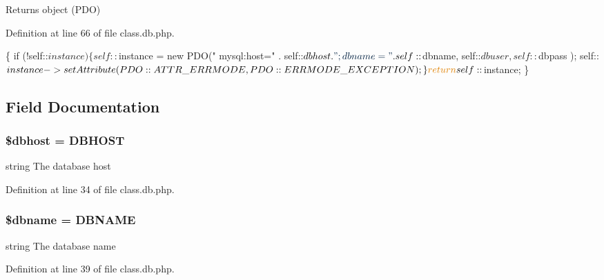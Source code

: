 \begin{DoxyReturn}{Returns}
object (P\-D\-O) 
\end{DoxyReturn}


Definition at line 66 of file class.\-db.\-php.


\begin{DoxyCode}
                                                    \{
                              \textcolor{keywordflow}{if} (!self::$instance) \{
                                             self::$instance = \textcolor{keyword}{new} PDO(\textcolor{stringliteral}{"
      mysql:host="} . self::$dbhost . \textcolor{stringliteral}{";dbname="} . self::$dbname, self::$dbuser, self::$dbpass
      );
                                             self::$instance-> setAttribute(
      PDO::ATTR\_ERRMODE, PDO::ERRMODE\_EXCEPTION);
                              \}
                              \textcolor{keywordflow}{return} self::$instance;
               \}
\end{DoxyCode}


\subsection{Field Documentation}
\hypertarget{class_d_b_a580dd98ba7f04c133d1a1e1b01af4a30}{
\subsubsection[{\$dbhost}]{\setlength{\rightskip}{0pt plus 5cm}\$dbhost = {\bf D\-B\-H\-O\-S\-T}\hspace{0.3cm}{\ttfamily [static]}}}\label{class_d_b_a580dd98ba7f04c133d1a1e1b01af4a30}
string The database host 

Definition at line 34 of file class.\-db.\-php.

\hypertarget{class_d_b_ac5111a571fffa2499732833bb7f0d8c1}{
\subsubsection[{\$dbname}]{\setlength{\rightskip}{0pt plus 5cm}\$dbname = {\bf D\-B\-N\-A\-M\-E}\hspace{0.3cm}{\ttfamily [static]}}}\label{class_d_b_ac5111a571fffa2499732833bb7f0d8c1}
string The database name 

Definition at line 39 of file class.\-db.\-php.

